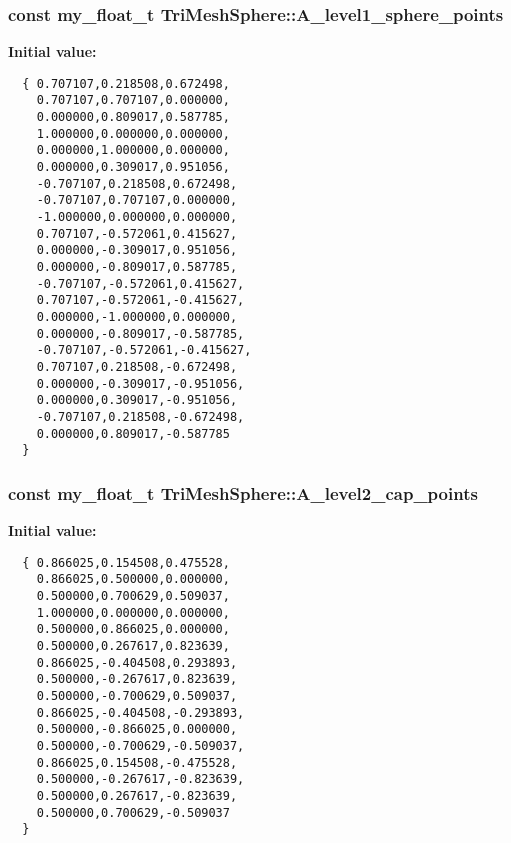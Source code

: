 \subsubsection{\setlength{\rightskip}{0pt plus 5cm}const my\_\-float\_\-t Tri\-Mesh\-Sphere::A\_\-level1\_\-sphere\_\-points\hspace{0.3cm}{\tt  [static, private]}}\label{classSimSite3D_1_1geometry_1_1TriMeshSphere_3f273941f74164c78f9338072e17f6e1}


\textbf{Initial value:}

\begin{Code}\begin{verbatim}
  { 0.707107,0.218508,0.672498,
    0.707107,0.707107,0.000000,
    0.000000,0.809017,0.587785,
    1.000000,0.000000,0.000000,
    0.000000,1.000000,0.000000,
    0.000000,0.309017,0.951056,
    -0.707107,0.218508,0.672498,
    -0.707107,0.707107,0.000000,
    -1.000000,0.000000,0.000000,
    0.707107,-0.572061,0.415627,
    0.000000,-0.309017,0.951056,
    0.000000,-0.809017,0.587785,
    -0.707107,-0.572061,0.415627,
    0.707107,-0.572061,-0.415627,
    0.000000,-1.000000,0.000000,
    0.000000,-0.809017,-0.587785,
    -0.707107,-0.572061,-0.415627,
    0.707107,0.218508,-0.672498,
    0.000000,-0.309017,-0.951056,
    0.000000,0.309017,-0.951056,
    -0.707107,0.218508,-0.672498,
    0.000000,0.809017,-0.587785
  }
\end{verbatim}\end{Code}
\subsubsection{\setlength{\rightskip}{0pt plus 5cm}const my\_\-float\_\-t Tri\-Mesh\-Sphere::A\_\-level2\_\-cap\_\-points\hspace{0.3cm}{\tt  [static, private]}}\label{classSimSite3D_1_1geometry_1_1TriMeshSphere_a007ec03a3a5930ee56566c87f2a2772}


\textbf{Initial value:}

\begin{Code}\begin{verbatim}
  { 0.866025,0.154508,0.475528,
    0.866025,0.500000,0.000000,
    0.500000,0.700629,0.509037,
    1.000000,0.000000,0.000000,
    0.500000,0.866025,0.000000,
    0.500000,0.267617,0.823639,
    0.866025,-0.404508,0.293893,
    0.500000,-0.267617,0.823639,
    0.500000,-0.700629,0.509037,
    0.866025,-0.404508,-0.293893,
    0.500000,-0.866025,0.000000,
    0.500000,-0.700629,-0.509037,
    0.866025,0.154508,-0.475528,
    0.500000,-0.267617,-0.823639,
    0.500000,0.267617,-0.823639,
    0.500000,0.700629,-0.509037
  }
\end{verbatim}\end{Code}
